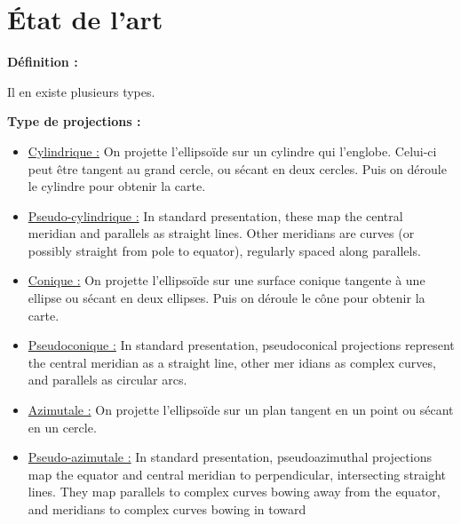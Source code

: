 \documentclass{article}
\begin{document}
\vspace{1\baselineskip}
\section{ État de l'art}

\textbf{Définition :} \newline

 \newline
Il en existe plusieurs types. \newline

\textbf{Type de projections :}
\begin{itemize}
    \item \underline{Cylindrique :} \newline
        On projette l'ellipsoïde sur un cylindre qui l'englobe. Celui-ci peut être tangent au grand cercle, ou sécant en deux cercles. Puis on déroule le cylindre pour obtenir la carte.
    \item \underline{Pseudo-cylindrique :} \newline
        In standard presentation, these map the central meridian and parallels as straight lines. 
        Other meridians are curves (or possibly straight from pole to equator), regularly spaced 
        along parallels.
    \item \underline{Conique :} \newline
        On projette l'ellipsoïde sur une surface conique tangente à une ellipse ou sécant en deux ellipses. Puis on déroule le cône pour obtenir la carte.
    \item \underline{Pseudoconique :} \newline
        In standard presentation, pseudoconical projections represent the central meridian as a 
        straight line, other mer
        idians as complex curves, and parallels as circular arcs.
    \item \underline{Azimutale :} \newline
        On projette l'ellipsoïde sur un plan tangent en un point ou sécant en un cercle.
    \item \underline{Pseudo-azimutale :} \newline
        In standard presentation, pseudoazimuthal projections map the equator
        and central 
        meridian to perpendicular, intersecting straight lines. They map parallels to complex 
        curves bowing away from the equator, and meridians to complex curves bowing in toward 

\end{itemize}
\end{document}
